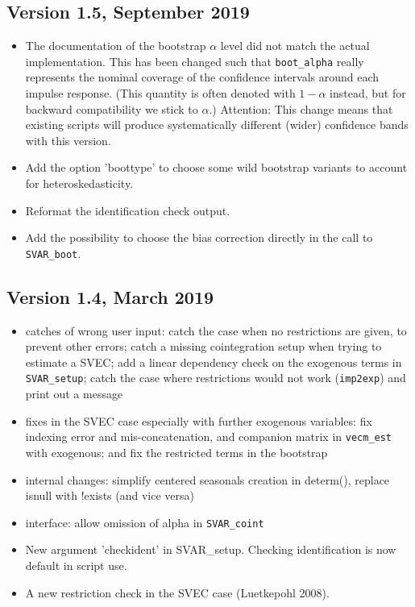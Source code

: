 \documentclass[a4paper,10pt]{article}
\newcounter{script}[section]
\begin{document}
\subsection*{Version 1.5, September 2019}
\begin{itemize}

\item The documentation of the bootstrap $\alpha$ level did not match the actual
implementation. This has been changed such that \texttt{boot\_alpha} really 
represents the nominal coverage of the confidence intervals around each impulse
response. (This quantity is often denoted with $1 - \alpha$ instead, but for 
backward compatibility we stick to $\alpha$.)
Attention: This change means that existing scripts will produce systematically 
different (wider) confidence bands with this version.

\item Add the option 'boottype' to choose some wild bootstrap variants to account for 
heteroskedasticity.

\item Reformat the identification check output.

\item Add the possibility to choose the bias correction directly in the call to \texttt{SVAR\_boot}.

\end{itemize}

\subsection*{Version 1.4, March 2019}
\begin{itemize}

\item catches of wrong user input: catch the case when no restrictions are given, 
to prevent other errors; catch a missing cointegration setup when trying to 
estimate a SVEC; add a linear dependency check on the exogenous terms 
in \texttt{SVAR\_setup}; catch the case where restrictions would not work 
(\texttt{imp2exp}) and print out a message

\item fixes in the SVEC case especially with further exogenous variables: 
fix indexing error and mis-concatenation, and companion matrix in \texttt{vecm\_est} 
with exogenous; and fix the restricted terms in the bootstrap
 
\item internal changes: simplify centered seasonals creation in determ(),
replace isnull with !exists (and vice versa)

\item interface: allow omission of alpha in \texttt{SVAR\_coint}

\item New argument 'checkident' in SVAR\_setup. Checking identification is now default 
  in script use.

\item A new restriction check in the SVEC case (Luetkepohl 2008).

\end{itemize}
\end{document}
